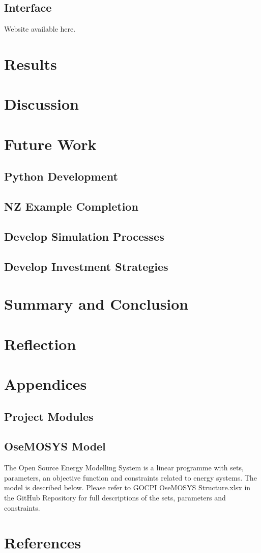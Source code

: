 \documentclass[12pt]{article}
\begin{document}
\subsection{Interface}
Website available here.
\newpage
\section{Results}
\newpage
\section{Discussion}
\newpage
\section{Future Work}
\subsection{Python Development}
\subsection{NZ Example Completion}
\subsection{Develop Simulation Processes}
\subsection{Develop Investment Strategies}
\newpage
\section{Summary and Conclusion}
\newpage
\section{Reflection}
\newpage
\section{Appendices}
\subsection{Project Modules}
\subsection{OseMOSYS Model}
The Open Source Energy Modelling System is a linear programme with sets, parameters, an objective function and constraints related to energy systems.
The model is described below. Please refer to GOCPI OseMOSYS Structure.xlsx in the GitHub Repository for full descriptions of the sets, parameters and constraints.
%
\newpage
\section{References}
\printbibliography
\end{document}
